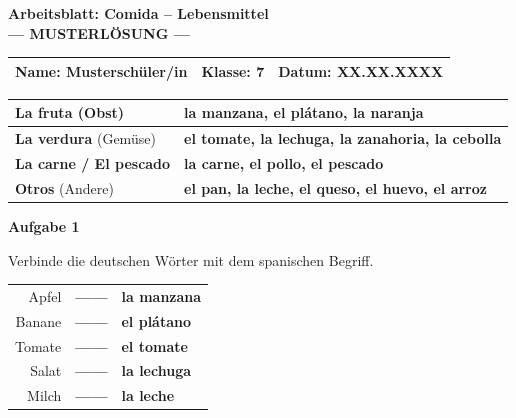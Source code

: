 \documentclass[11pt, a4paper]{article}
\newcommand{\fachfarbe}{spanisch}
\newcommand{\thema}{Comida -- Lebensmittel}
\newcommand{\klasse}{7}
\newcommand{\punktebox}[1]{\hfill\fbox{\small \_/#1}}
\newcommand{\loesung}[1]{\textcolor{loesung}{\textbf{#1}}}
\newenvironment{aufgabe}[1]{%
    \vspace{10pt}
    \noindent\textbf{\textcolor{\fachfarbe}{Aufgabe #1}}
    \vspace{5pt}
    \begin{list}{}{\leftmargin=0pt}
    \item[]
}{%
    \end{list}
}
\begin{document}
\begin{center}
    {\Large\bfseries\textcolor{\fachfarbe}{Arbeitsblatt: \thema}}\\[0.3em]
    {\large\textcolor{loesung}{\textbf{--- MUSTERLÖSUNG ---}}}
\end{center}

\vspace{5pt}

\noindent
\begin{tabularx}{\textwidth}{|X|X|X|}
\hline
\textbf{Name:} \textcolor{loesung}{Musterschüler/in} &
\textbf{Klasse:} \klasse &
\textbf{Datum:} \textcolor{loesung}{XX.XX.XXXX} \\
\hline
\end{tabularx}

\vspace{15pt}


\begin{merkkasten}

\begin{tabularx}{\textwidth}{|l|X|}
\hline
\textbf{La fruta} (Obst) & \loesung{la manzana, el plátano, la naranja} \\[0.5em]
\hline
\textbf{La verdura} (Gemüse) & \loesung{el tomate, la lechuga, la zanahoria, la cebolla} \\[0.5em]
\hline
\textbf{La carne / El pescado} & \loesung{la carne, el pollo, el pescado} \\[0.5em]
\hline
\textbf{Otros} (Andere) & \loesung{el pan, la leche, el queso, el huevo, el arroz} \\[0.5em]
\hline
\end{tabularx}

\end{merkkasten}

\vspace{10pt}


\begin{aufgabe}{1}
Verbinde die deutschen Wörter mit dem spanischen Begriff. \punktebox{5}
\end{aufgabe}

\begin{center}
\begin{tabular}{rcl}
Apfel & \loesung{------} & \loesung{la manzana} \\[0.8em]
Banane & \loesung{------} & \loesung{el plátano} \\[0.8em]
Tomate & \loesung{------} & \loesung{el tomate} \\[0.8em]
Salat & \loesung{------} & \loesung{la lechuga} \\[0.8em]
Milch & \loesung{------} & \loesung{la leche} \\
\end{tabular}
\end{center}
\end{document}
